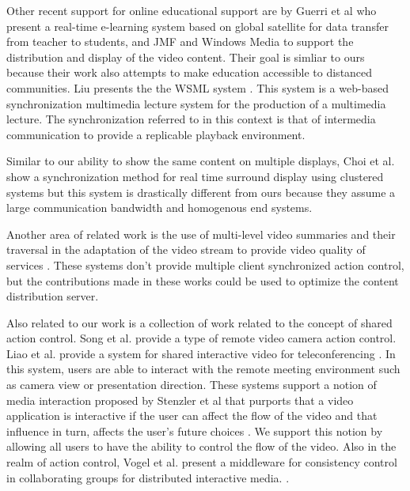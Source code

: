 \documentclass{sig-alternate}
\begin{document}
Other recent support for online educational support are by Guerri et
al who present a real-time e-learning system based on global satellite
for data transfer from teacher to students, and JMF and Windows Media
\cite{GUERRI} to support the distribution and display of the video
content.  Their goal is simliar to ours because their work also
attempts to make education accessible to distanced communities.  Liu
presents the the WSML system \cite{LIU2}.  This system is a web-based
synchronization multimedia lecture system for the production of a
multimedia lecture.  The synchronization referred to in this context
is that of intermedia communication to provide a replicable playback
environment.

Similar to our ability to show the same content on multiple displays,
Choi et al. show a synchronization method for real time surround
display using clustered systems \cite{CHOI} but this system is
drastically different from ours because they assume a large
communication bandwidth and homogenous end systems.

Another area of related work is the use of multi-level video summaries
and their traversal in the adaptation of the video stream to provide
video quality of services
\cite{CUI,KRASIC,LEI,NEUMANN,SHIPMAN,TAN,THAKUR}.  These systems don't
provide multiple client synchronized action control, but the
contributions made in these works could be used to optimize the
content distribution server.

Also related to our work is a collection of work related to the
concept of shared action control.  Song et al. \cite{SONG} provide a
type of remote video camera action control.  Liao et al. provide a
system for shared interactive video for teleconferencing \cite{LIAO}.
In this system, users are able to interact with the remote meeting
environment such as camera view or presentation direction.  These
systems support a notion of media interaction proposed by Stenzler et
al that purports that a video application is interactive if the user
can affect the flow of the video and that influence in turn, affects
the user's future choices \cite{STENZLER}.  We support this notion by
allowing all users to have the ability to control the flow of the
video.  Also in the realm of action control, Vogel et al. present a
middleware for consistency control in collaborating groups for
distributed interactive media.  \cite{VOGEL}.
\end{document}
